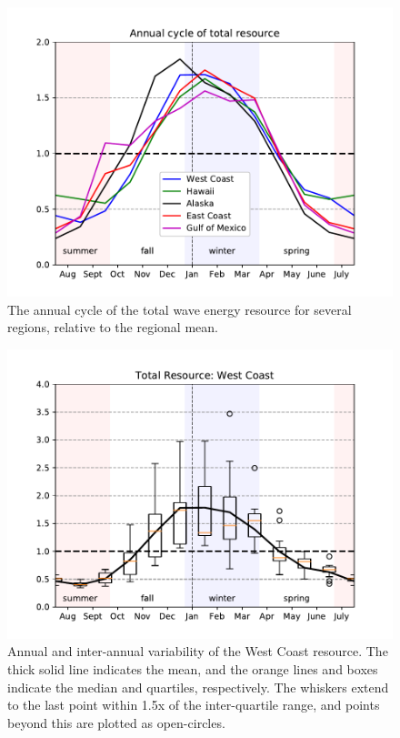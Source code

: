 \begin{figure}[ht]
  \centering
  \includegraphics[width=\textwidth]{../fig/AnnualCycle01.pdf}
  \caption[Wave resource annual cycle.]{The annual cycle of the total wave energy resource for several regions, relative to the regional mean.}
  \label{fig:annual-cycle}
\end{figure}


\begin{figure}[ht]
  \centering
  \includegraphics[width=\textwidth]{../fig/AnnualVar01.wc.pdf}
  \caption[West Coast resource variability.]{Annual and inter-annual variability of the West Coast resource. The thick solid line indicates the mean, and the orange lines and boxes indicate the median and quartiles, respectively. The whiskers extend to the last point within 1.5x of the inter-quartile range, and points beyond this are plotted as open-circles.}
  \label{fig:wc-variability}
\end{figure}

